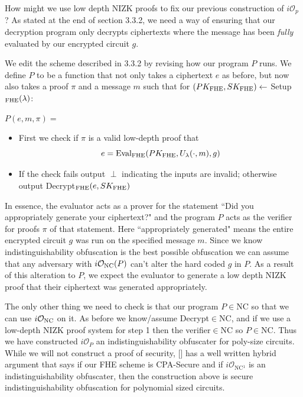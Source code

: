 \documentclass[12pt,twoside]{reedthesis}
\begin{document}
    \par How might we use low depth NIZK proofs to fix our previous construction of $i\mathcal{O}_p$? As stated at the end of section 3.3.2, we need a way of ensuring that our decryption program only decrypts ciphertexts where the message has been \textit{fully} evaluated by our encrypted circuit $g$.
    \par We edit the scheme described in 3.3.2 by revising how our program $P$ runs. We define $P$ to be a function that not only takes a ciphertext $e$ as before, but now also takes a proof $\pi$ and a message $m$ such that for $(PK_\text{FHE},SK_\text{FHE}) \leftarrow$ Setup$_\text{FHE}(\lambda)$:
    
   
   \par$P(e,m,\pi) =$
   \begin{itemize}
   \item First we check if $\pi$ is a valid low-depth proof that
   $$e =\text{Eval}_\text{FHE}(PK_\text{FHE},U_\lambda(\cdot,m),g) $$
   \item If the check fails output $\perp$ indicating the inputs are invalid; otherwise output Decrypt$_\text{FHE}(e,SK_\text{FHE})$
   \end{itemize}
    
    
    \par In essence, the evaluator acts as a prover for the statement ``Did you appropriately generate your ciphertext?" and the program $P$ acts as the verifier for proofs $\pi$ of that statement. Here ``appropriately generated" means the entire encrypted circuit $g$ was run on the specified message $m$. Since we know indistinguishability obfuscation is the best possible obfuscation we can assume that any adversary with $i\mathcal{O}_\text{NC}(P)$ can't alter the hard coded $g$ in $P$. As a result of this alteration to $P$, we expect the evaluator to generate a low depth NIZK proof that their ciphertext was generated appropriately.
    \par The only other thing we need to check is that our program $P\in$NC so that we can use $i\mathcal{O}_\text{NC}$ on it. As before we know/assume Decrypt$\in$NC, and if we use a low-depth NIZK proof system for step 1 then the verifier$\in$NC so $P\in$NC. Thus we have constructed $i\mathcal{O}_P$ an indistinguishability obfuscater for poly-size circuits. While we will not construct a proof of security, [\cite{Garg:2013}] has a well written hybrid argument that says if our FHE scheme is CPA-Secure and if $i\mathcal{O}_\text{NC$^1$}$  is an indistinguishability obfuscater, then the construction above is secure indistinguishability obfuscation for polynomial sized circuits.
    
\end{document}
